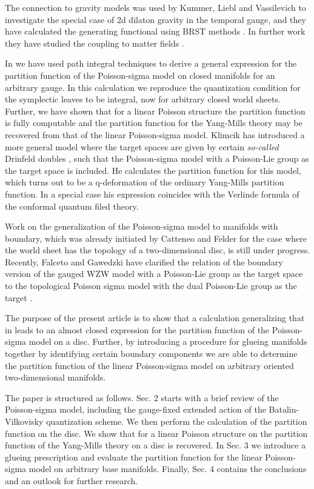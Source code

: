 \documentclass[a4paper,twoside,11pt]{article}
\numberwithin{equation}{section}
\begin{document}
The connection to gravity models was used by Kummer, Liebl and Vassilevich  to investigate the special case of 2d dilaton gravity in 
the temporal gauge, and they 
have calculated the generating functional using BRST methods \cite{KLV1}. In further work they have studied the coupling to matter 
fields \cite{KLV2}. 

In \cite{HS} we have used path integral techniques to derive a general expression for the partition function of the Poisson-sigma model 
on closed manifolds for an arbitrary gauge.  In this calculation we reproduce the quantization condition for the symplectic leaves to 
be integral, now for arbitrary closed world sheets. Further, we have shown that for a linear Poisson structure the partition function is 
fully computable and 
the partition function for the Yang-Mills theory may be recovered from that of the linear Poisson-sigma model. 
Klimcik \cite{KC} has introduced a more general model where the target spaces are given by certain  {\it so-called} Drinfeld doubles \cite{D}, 
such that the Poisson-sigma model with a Poisson-Lie group as the target space is included. He calculates the partition function for this model, which turns out to be 
a q-deformation of the ordinary Yang-Mills partition function. In a special case his expression coincides with the Verlinde formula of the conformal quantum filed theory.

Work on the generalization of the Poisson-sigma model to manifolds with boundary, which was already 
initiated by Catteneo and Felder for the case where the world sheet has the topology of a 
two-dimensional disc, is still under progress. Recently, Falceto and Gawedzki have clarified the relation of the boundary version of the gauged WZW model with a 
Poisson-Lie group \coordHE{} as the target space to the topological Poisson sigma model with the dual Poisson-Lie group \coordHE{} as the target \cite{GF}.
 
The purpose of the present article is to show that a calculation generalizing that in \cite{HS} leads to an almost closed expression for 
the partition function of the 
Poisson-sigma model on a disc.  Further, by introducing a procedure for glueing manifolds together by identifying certain boundary components 
we are able to determine the partition function of the linear Poisson-sigma model on arbitrary oriented two-dimensional manifolds. 

The paper is structured as follows. Sec. 2 starts with  a brief review of the Poisson-sigma model, 
including the gauge-fixed extended action of the Batalin-Vilkovisky quantization scheme.  We then perform the calculation 
of the partition function on the disc. We show that for a linear Poisson structure on \coordHE{} 
 the partition function of the \coordHE{} Yang-Mills theory on a disc is recovered. In Sec. 3 we introduce a glueing prescription 
and evaluate the partition function for the linear Poisson-sigma model on arbitrary base manifolds. 
Finally, Sec. 4 contains the conclusions and an outlook for further research.
%
%
%
\end{document}
